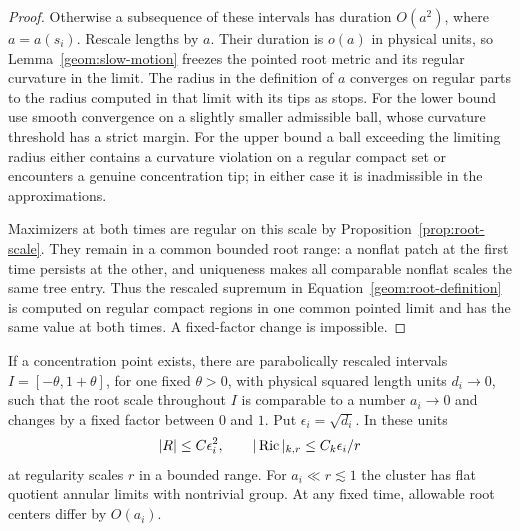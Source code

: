 \begin{proof}
Otherwise a subsequence of these intervals has duration $O(a^2)$,
where $a=a(s_i)$. Rescale lengths by $a$. Their duration is $o(a)$
in physical units, so
Lemma~\ref{geom:slow-motion} freezes the pointed root metric and its
regular curvature in the limit. The radius in the definition of
$a$ converges on regular parts to the radius computed in that
limit with its tips as stops. For the lower bound use smooth
convergence on a slightly smaller admissible ball, whose curvature
threshold has a strict margin. For the upper
bound a ball exceeding the limiting radius either contains a
curvature violation on a regular compact set or encounters a
genuine concentration tip; in either case it is inadmissible in
the approximations.

Maximizers at both times are regular on this scale by
Proposition~\ref{prop:root-scale}. They remain in a common bounded
root range: a nonflat patch at the first time persists at the other,
and uniqueness makes all comparable nonflat scales the same tree
entry. Thus the rescaled supremum in
Equation~\eqref{geom:root-definition} is computed on regular compact
regions in one common pointed limit and has the same value at both
times. A fixed-factor change is impossible.
\end{proof}

\begin{proposition}\label{prop:buffered-intervals}
If a concentration point exists, there are parabolically rescaled
intervals $I=[-\theta,1+\theta]$, for one fixed $\theta>0$, with
physical squared length units $d_i\to0$, such that the root scale
throughout $I$ is comparable to a number $a_i\to0$ and changes by a
fixed factor between $0$ and $1$. Put $\epsilon_i=\sqrt{d_i}$.
In these units
\[
 |R|\leq C\epsilon_i^2,\qquad
 |\operatorname{Ric}|_{k,r}\leq C_k\epsilon_i/r
\]
at regularity scales $r$ in a bounded range. For $a_i\ll r\lesssim1$
the cluster has flat quotient annular limits with nontrivial group.
At any fixed time, allowable root centers differ by $O(a_i)$.
\end{proposition}

